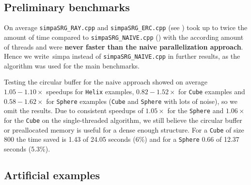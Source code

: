 \documentclass{article}
\begin{document}
\subsection{Preliminary benchmarks}\label{subsec:prelbench}
On average \texttt{simpaSRG\_RAY.cpp} and \texttt{simpaSRG\_ERC.cpp} (see ) took up to twice the amount of time compared to \texttt{simpaSRG\_NAIVE.cpp} () with the according amount of threads and were \textbf{never faster than the naive parallelization approach}.
Hence we write~\ac{simpa} instead of \texttt{simpaSRG\_NAIVE.cpp} in further results, as the algorithm was used for the main benchmarks.\par
Testing the circular buffer for the naive approach showed on average $1.05-1.10\times$ speedups for \texttt{Helix} examples, $0.82-1.52\times $ for \texttt{Cube} examples and $0.58-1.62\times $ for \texttt{Sphere} examples (\texttt{Cube} and \texttt{Sphere} with lots of noise), so we omit the results.
Due to consistent speedups of $1.05\times $ for the \texttt{Sphere} and $1.06\times $ for the \texttt{Cube} on the single-threaded algorithm, we still believe the circular buffer or preallocated memory is useful for a dense enough structure.
For a \texttt{Cube} of size 800 the time saved is 1.43 of 24.05 seconds (6\%) and for a \texttt{Sphere} 0.66 of 12.37 seconds (5.3\%).

\subsection{Artificial examples}\label{subsec:artiexamples}
\end{document}
